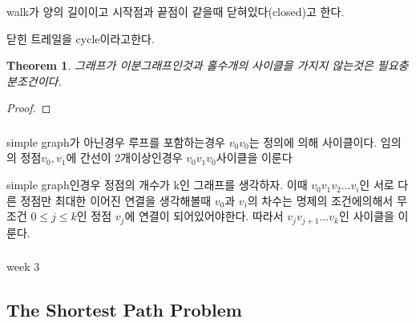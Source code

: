\documentclass{oblivoir}
\newtheorem{theorem}{Theorem}[section]
\begin{document}
\begin{dfn}[cycle]
walk가 양의 길이이고 시작점과 끝점이 같을때 닫혀있다(closed)고 한다. 

닫힌 트레일을 cycle이라고한다.
\end{dfn}

\begin{theorem}
    그래프가 이분그래프인것과 홀수개의 사이클을 가지지 않는것은 필요충분조건이다.
\end{theorem}
\begin{proof}
    
\end{proof}
\subsubsection{} 
\subsubsection{} 
simple graph가 아닌경우
        루프를 포함하는경우 $v_0v_0$는 정의에 의해 사이클이다.
            임의의 정점$v_0, v_1$에 간선이 2개이상인경우            $v_0v_1v_0$사이클을 이룬다
        
    simple graph인경우
        정점의 개수가 k인 그래프를 생각하자. 이때 $v_0v_1v_2 ... v_i$인 서로 다른 정점만 최대한 이어진 연결을 생각해볼때 $v_0$과 $v_i$의 차수는 명제의 조건에의해서 무조건 $0 \le j \le k$인 정점 $v_j$에 연결이 되어있어야한다. 따라서 $v_{j}v_{j+1} ... v_k$인 사이클을 이룬다.
\subsubsection{} 
\subsubsection{} 
\subsubsection{} 

week 3
\subsection{The Shortest Path Problem }
\subsubsection{} 
%
\subsubsection{} 
%
\end{document}
